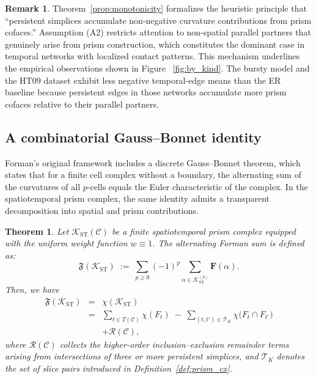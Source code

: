 \documentclass[
    pre,
    twocolumn,
    superscriptaddress,
    showpacs,
    nofootinbib,
    amsmath,
    amssymb,
    floatfix
]{revtex4-2}
\newcommand{\K}{\mathcal{K}}
\newcommand{\F}{\mathbf{F}}        %
\theoremstyle{plain} %
\newtheorem{theorem}{\indent Theorem} %
\theoremstyle{definition} %
\newtheorem{remark}{\indent Remark}
\begin{document}
\begin{remark}\label{rem:monotonicity_interpretation}
Theorem~\ref{prop:monotonicity} formalizes the heuristic principle that ``persistent simplices accumulate non-negative curvature contributions from prism cofaces.''
Assumption (A2) restricts attention to non-spatial parallel partners that genuinely arise from prism construction, which constitutes the dominant case in temporal networks with localized contact patterns.
This mechanism underlines the empirical observations shown in Figure ~\ref{fig:by_kind}. The bursty model and the HT09 dataset exhibit less negative temporal-edge means than the ER baseline because persistent edges in those networks accumulate more prism cofaces relative to their parallel partners.
\end{remark}

\subsection{A combinatorial Gauss--Bonnet identity}\label{ssec:gauss_bonnet}

Forman's original framework includes a discrete Gauss--Bonnet theorem, which states that for a finite cell complex without a boundary, the alternating sum of the curvatures of all $p$-cells equals the Euler characteristic of the complex.
In the spatiotemporal prism complex, the same identity admits a transparent decomposition into spatial and prism contributions.

\begin{theorem}\label{prop:gauss_bonnet}
Let $\K_{\mathrm{ST}}(\mathcal{C})$ be a finite spatiotemporal prism complex equipped with the uniform weight function $w \equiv 1$. The alternating Forman sum is defined as:
\begin{equation*}\label{eq:GB_lhs}
\mathfrak{F}(\K_{\mathrm{ST}}) \;:=\;
\sum_{p\geq 0}(-1)^p\!\sum_{\alpha\in\K_{\mathrm{ST}}^{(p)}}\!\F(\alpha).
\end{equation*}
Then, we have
\begin{eqnarray}\label{eq:GB_decomp}
\mathfrak{F}(\K_{\mathrm{ST}}) &=& \chi(\K_{\mathrm{ST}})\nonumber\\
&=& \sum_{t\in T(\mathcal{C})}\chi(F_t) \;-\; \sum_{(t,t')\in\mathcal{T}_K}\chi\bigl(F_t\cap F_{t'}\bigr)\nonumber\\
&\ & + \mathcal{R}(\mathcal{C}),
\end{eqnarray}
where $\mathcal{R}(\mathcal{C})$ collects the higher-order inclusion--exclusion remainder terms arising from intersections of three or more persistent simplices, and $\mathcal{T}_K$ denotes the set of slice pairs introduced in Definition~\ref{def:prism_cx}.
\end{theorem}
\end{document}
